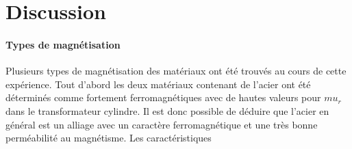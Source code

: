 \section{Discussion}


\paragraph*{Types de magnétisation}
Plusieurs types de magnétisation des matériaux ont été trouvés au cours de cette expérience. Tout d'abord les deux matériaux contenant de l'acier ont été déterminés comme fortement ferromagnétiques avec de hautes valeurs pour \(mu_r\) dans le transformateur cylindre. Il est donc possible de déduire que l'acier en général est un alliage avec un caractère ferromagnétique et une très bonne perméabilité au magnétisme. Les caractéristiques 